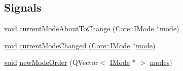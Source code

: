 \subsection*{Signals}
\begin{DoxyCompactItemize}
\item 
\hyperlink{group___u_a_v_objects_plugin_ga444cf2ff3f0ecbe028adce838d373f5c}{void} \hyperlink{group___core_plugin_gaa77e7371f833a065f7608953552acb2e}{current\-Mode\-About\-To\-Change} (\hyperlink{class_core_1_1_i_mode}{Core\-::\-I\-Mode} $\ast$\hyperlink{glext_8h_a1e71d9c196e4683cc06c4b54d53f7ef5}{mode})
\item 
\hyperlink{group___u_a_v_objects_plugin_ga444cf2ff3f0ecbe028adce838d373f5c}{void} \hyperlink{group___core_plugin_gae6bfcb951bb5f94b642a368c82116faf}{current\-Mode\-Changed} (\hyperlink{class_core_1_1_i_mode}{Core\-::\-I\-Mode} $\ast$\hyperlink{glext_8h_a1e71d9c196e4683cc06c4b54d53f7ef5}{mode})
\item 
\hyperlink{group___u_a_v_objects_plugin_ga444cf2ff3f0ecbe028adce838d373f5c}{void} \hyperlink{group___core_plugin_ga43ebcb6f603d4f852c917bc5ed76c124}{new\-Mode\-Order} (Q\-Vector$<$ \hyperlink{class_core_1_1_i_mode}{I\-Mode} $\ast$ $>$ \hyperlink{group___core_plugin_gafe066d728cdaeffc19eb6407a41e29e0}{modes})
\end{DoxyCompactItemize}
